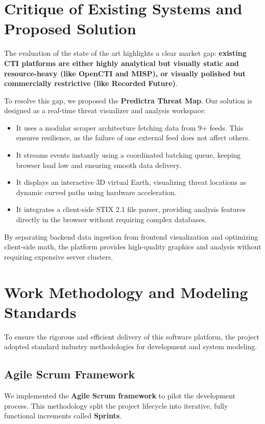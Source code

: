 \section{Critique of Existing Systems and Proposed Solution}
The evaluation of the state of the art highlights a clear market gap: \textbf{existing CTI platforms are either highly analytical but visually static and resource-heavy (like OpenCTI and MISP), or visually polished but commercially restrictive (like Recorded Future)}. 

To resolve this gap, we proposed the \textbf{Predictra Threat Map}. Our solution is designed as a real-time threat visualizer and analysis workspace:
\begin{itemize}
    \item It uses a modular scraper architecture fetching data from 9+ feeds. This ensures resilience, as the failure of one external feed does not affect others.
    \item It streams events instantly using a coordinated batching queue, keeping browser load low and ensuring smooth data delivery.
    \item It displays an interactive 3D virtual Earth, visualizing threat locations as dynamic curved paths using hardware acceleration.
    \item It integrates a client-side STIX 2.1 file parser, providing analysis features directly in the browser without requiring complex databases.
\end{itemize}

By separating backend data ingestion from frontend visualization and optimizing client-side math, the platform provides high-quality graphics and analysis without requiring expensive server clusters.

\section{Work Methodology and Modeling Standards}
To ensure the rigorous and efficient delivery of this software platform, the project adopted standard industry methodologies for development and system modeling.

\subsection{Agile Scrum Framework}
We implemented the \textbf{Agile Scrum framework} to pilot the development process. This methodology split the project lifecycle into iterative, fully functional increments called \textbf{Sprints}.

